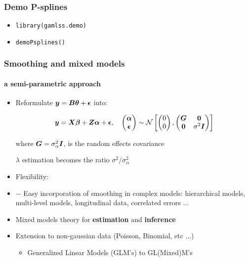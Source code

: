\documentclass[11pt]{beamer}
\newcommand{\bfy}{\mbox{\boldmath $y$}}
\newcommand{\bfB}{\mbox{\boldmath $B$}}
\newcommand{\bfG}{\mbox{\boldmath $G$}}
\newcommand{\bfI}{\mbox{\boldmath $I$}}
\newcommand{\bfX}{\mbox{\boldmath $X$}}
\newcommand{\bfbeta}{\mbox{\boldmath $\beta$}}
\newcommand{\bfalpha}{\mbox{\boldmath $\alpha$}}
\newcommand{\bfepsilon}{\mbox{\boldmath$\epsilon$}}
\newcommand{\bfzero}{\mbox{\boldmath $0$}}
\newcommand{\bftheta}{\mbox{\boldmath $\theta$}}
\newcommand{\bfZ}{\boldsymbol{Z}}
\begin{document}
\begin{frame}[fragile]
\frametitle{Demo P-splines}
 \begin{itemize}
   \item \texttt{library(gamlss.demo)} 
   \item[] \quad \texttt{demoPsplines()}
 \end{itemize}
\end{frame}


\begin{frame}
 \frametitle{Smoothing and mixed models}
 	\framesubtitle{\quad a semi-parametric approach}
\footnotesize

 	\begin{itemize}
 	
 	\item Reformulate $\bfy= \bfB\bftheta + \bfepsilon$  into: 
 	
 	$$
 	  \bfy =  \bfX\bfbeta + \bfZ\bfalpha + \bfepsilon, \quad 
 	\begin{pmatrix}
 	\bfalpha \\
 	\bfepsilon
 	\end{pmatrix}
 	\sim
 	\mathcal{N}
 	\begin{bmatrix}
 	\begin{pmatrix}
 	0 \\
 	0
 	\end{pmatrix}
 	,
 	\begin{pmatrix}
 	   \bfG & \bfzero \\
 	\bfzero & \sigma^2\bfI
 	\end{pmatrix}
 	\end{bmatrix}
 	$$
 	
	\quad where $\bfG = \sigma^2_\alpha\bfI$, is the random effects covariance
 	
	\qquad \qquad $\lambda$ estimation becomes the ratio ${\sigma^2}/{\sigma_\alpha^2}$

 \item \alert{Flexibility:}
%
 \item[]\qquad$-$ Easy incorporation of smoothing in \alert{complex models}: hierarchical models, multi-level models, longitudinal data, correlated errors ...
%
 \item \alert{Mixed models theory} for {\bf estimation} and {\bf inference}
%
 \item \alert{Extension to non-gaussian data} (Poisson, Binomial, etc ...)
%
 \begin{itemize}
 \item \footnotesize Generalized Linear Models (GLM's) to GL(Mixed)M's
 \end{itemize}
 \end{itemize}

\vfill

\vfill


\end{frame}
\end{document}
